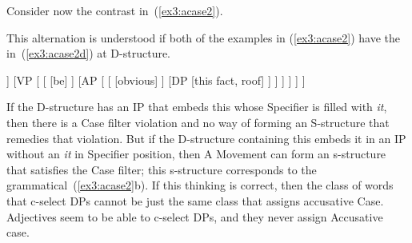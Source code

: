 Consider now the contrast in~(\ref{ex3:acase2}).
\begin{exe}
	\raggedright
	\ex \label{ex3:acase2} 
	\begin{xlist}
	\end{xlist}
\end{exe}
This alternation is understood if both of the examples in (\ref{ex3:acase2}) have the  in~(\ref{ex3:acase2d}) at D-structure.
\begin{exe}
	\raggedright
	\ex \label{ex3:acase2d} 
	\small
	\begin{forest}
	[\ibar{I}
		[\obar{I} [pres] ]
		[VP [ 
			[ [be] ]
			[AP [ 
				[ [obvious] ]
				[DP [this fact, roof] ]
			] ]
		] ]
	]
	\end{forest}
\end{exe}
If the D-structure has an IP that embeds this  whose Specifier is filled with \emph{it}, then there is a Case filter violation and no way of forming an S-structure that remedies that violation. But if the D-structure containing this  embeds it in an IP without an \emph{it} in Specifier position, then A Movement can form an s-structure that satisfies the Case filter; this s-structure corresponds to the grammatical~(\ref{ex3:acase2}b). If this thinking is correct, then the class of words that c-select DPs cannot be just the same class that assigns accusative Case. Adjectives seem to be able to c-select DPs, and they never assign Accusative case.

